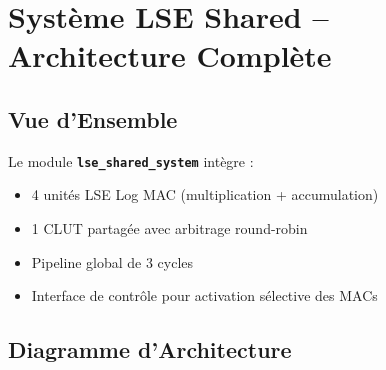 \documentclass[12pt,a4paper]{article}
\newcommand{\module}[1]{\textbf{\texttt{#1}}}
\begin{document}
\section{Système LSE Shared -- Architecture Complète}

\subsection{Vue d'Ensemble}

Le module \module{lse\_shared\_system} intègre :
\begin{itemize}
    \item 4 unités LSE Log MAC (multiplication + accumulation)
    \item 1 CLUT partagée avec arbitrage round-robin
    \item Pipeline global de 3 cycles
    \item Interface de contrôle pour activation sélective des MACs
\end{itemize}

\subsection{Diagramme d'Architecture}
\end{document}
